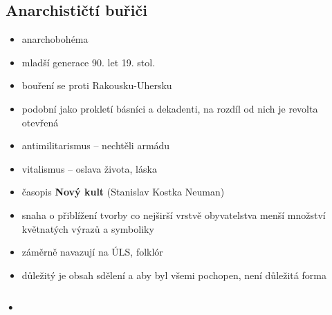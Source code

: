 \subsection{Anarchističtí buřiči}
\begin{itemize}
\item anarchobohéma
\item mladší generace 90. let 19. stol.
\item bouření se proti Rakousku-Uhersku 
\item podobní jako prokletí básníci a dekadenti, na rozdíl od nich je revolta otevřená
\item antimilitarismus -- nechtěli armádu
\item vitalismus -- oslava života, láska
\item časopis \textbf{Nový kult} (Stanislav Kostka Neuman)
\item snaha o přiblížení tvorby co nejširší vrstvě obyvatelstva \ra menší množství květnatých výrazů a symboliky
\item záměrně navazují na ÚLS, folklór
\item důležitý je obsah sdělení a aby byl všemi pochopen, není důležitá forma 
\end{itemize}

\subsubsection{•}


